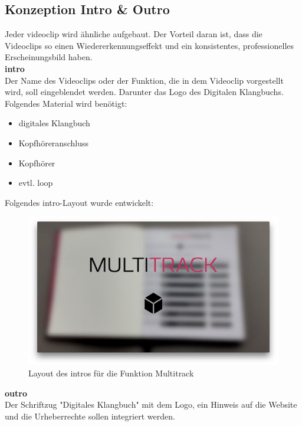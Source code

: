 



\subsection{Konzeption Intro \& Outro}
Jeder \gls{videoclip} wird ähnliche aufgebaut. Der Vorteil daran ist, dass die Videoclips so einen Wiedererkennungseffekt und ein konsistentes, professionelles Erscheinungsbild haben.\\


\textbf{\gls{intro}}\\
Der Name des Videoclips oder der Funktion, die in dem Videoclip vorgestellt wird, soll eingeblendet werden.
Darunter das Logo des Digitalen Klangbuchs. Folgendes Material wird benötigt:

\begin{itemize}
\item digitales Klangbuch
\item Kopfhöreranschluss
\item Kopfhörer
\item evtl. \gls{loop}
\end{itemize}

\vspace{0.5cm}

Folgendes \gls{intro}-Layout wurde entwickelt:

\begin{figure}[H]
\centering
\includegraphics[width=1.0\textwidth]{grafiken/layoutintro.png}
\caption{Layout des \gls{intro}s für die Funktion Multitrack}
\end{figure}


\textbf{\gls{outro}}\\
Der Schriftzug "Digitales Klangbuch" mit dem Logo, ein Hinweis auf die Website und die Urheberrechte sollen integriert werden.\\

